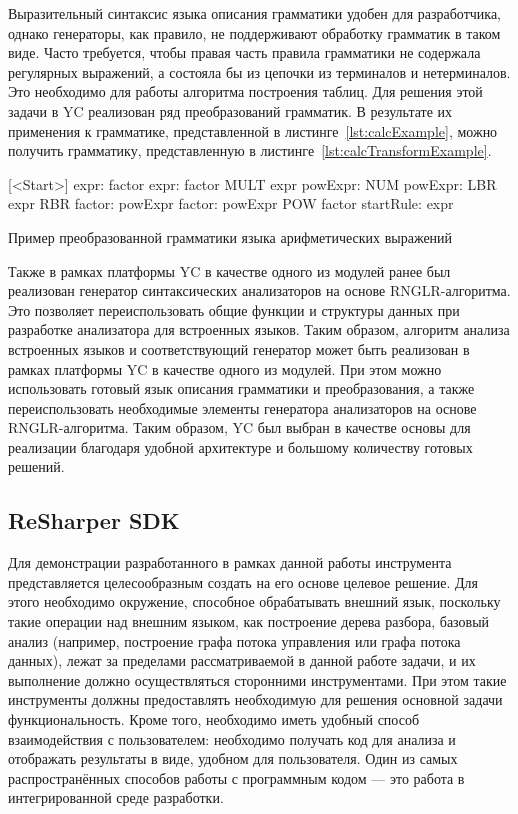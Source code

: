     Выразительный синтаксис языка описания грамматики удобен для разработчика, однако генераторы, как правило, не поддерживают обработку грамматик в таком виде. Часто требуется, чтобы правая часть правила  грамматики не содержала регулярных выражений, а состояла бы из цепочки из терминалов и нетерминалов. Это необходимо для работы алгоритма построения таблиц. Для решения этой задачи в YC реализован ряд преобразований грамматик. В результате их применения к грамматике, представленной в листинге~\ref{lst:calcExample}, можно получить грамматику, представленную в листинге~\ref{lst:calcTransformExample}.


\begin{listing}
    \begin{pyglist}[numbers=left,numbersep=5pt]
    
    [<Start>]
    expr: factor 
    expr: factor MULT expr
    powExpr: NUM 
    powExpr: LBR expr RBR
    factor: powExpr
    factor: powExpr POW factor
    startRule: expr

\end{pyglist}
\caption{Пример преобразованной грамматики языка арифметических выражений}
\label{lst:calcTransformExample}
\end{listing}

    Также в рамках платформы YC в качестве одного из модулей ранее был реализован генератор синтаксических анализаторов на основе RNGLR-алгоритма. Это позволяет переиспользовать общие функции и структуры данных при разработке анализатора для встроенных языков. 
    Таким образом, алгоритм анализа встроенных языков и соответствующий генератор может быть реализован в рамках платформы YC в качестве одного из модулей. При этом можно использовать готовый язык описания грамматики и преобразования, а также переиспользовать необходимые элементы генератора анализаторов на основе RNGLR-алгоритма. Таким образом, YC был выбран в качестве основы для реализации благодаря удобной архитектуре и большому количеству готовых решений. 


\subsection{ReSharper SDK}\label{ReSharperSDKDescr}

    Для демонстрации разработанного в рамках данной работы инструмента представляется целесообразным создать на его основе целевое решение. Для этого необходимо окружение, способное обрабатывать внешний язык, поскольку такие операции над внешним языком, как построение дерева разбора, базовый анализ (например, построение графа потока управления или графа потока данных), лежат за пределами рассматриваемой в данной работе задачи, и их выполнение должно осуществляться сторонними инструментами. При этом такие инструменты должны предоставлять необходимую для решения основной задачи функциональность. Кроме того, необходимо иметь удобный способ взаимодействия с пользователем: необходимо получать код для анализа и отображать результаты в виде, удобном для пользователя. Один из самых распространённых способов работы с программным кодом --- это работа в интегрированной среде разработки.

